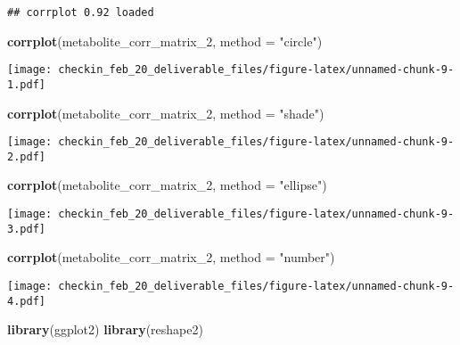 \documentclass[
]{article}
\newenvironment{Shaded}{\begin{snugshade}}{\end{snugshade}}
\newcommand{\AttributeTok}[1]{\textcolor[rgb]{0.13,0.29,0.53}{#1}}
\newcommand{\FunctionTok}[1]{\textcolor[rgb]{0.13,0.29,0.53}{\textbf{#1}}}
\newcommand{\NormalTok}[1]{#1}
\newcommand{\StringTok}[1]{\textcolor[rgb]{0.31,0.60,0.02}{#1}}
\begin{document}
\begin{verbatim}
## corrplot 0.92 loaded
\end{verbatim}

\begin{Shaded}
\begin{Highlighting}[]
\FunctionTok{corrplot}\NormalTok{(metabolite\_corr\_matrix\_2, }\AttributeTok{method =} \StringTok{"circle"}\NormalTok{)}
\end{Highlighting}
\end{Shaded}

\texttt{[image: checkin\_feb\_20\_deliverable\_files/figure-latex/unnamed-chunk-9-1.pdf]}

\begin{Shaded}
\begin{Highlighting}[]
\FunctionTok{corrplot}\NormalTok{(metabolite\_corr\_matrix\_2, }\AttributeTok{method =} \StringTok{"shade"}\NormalTok{)}
\end{Highlighting}
\end{Shaded}

\texttt{[image: checkin\_feb\_20\_deliverable\_files/figure-latex/unnamed-chunk-9-2.pdf]}

\begin{Shaded}
\begin{Highlighting}[]
\FunctionTok{corrplot}\NormalTok{(metabolite\_corr\_matrix\_2, }\AttributeTok{method =} \StringTok{"ellipse"}\NormalTok{)}
\end{Highlighting}
\end{Shaded}

\texttt{[image: checkin\_feb\_20\_deliverable\_files/figure-latex/unnamed-chunk-9-3.pdf]}

\begin{Shaded}
\begin{Highlighting}[]
\FunctionTok{corrplot}\NormalTok{(metabolite\_corr\_matrix\_2, }\AttributeTok{method =} \StringTok{"number"}\NormalTok{)}
\end{Highlighting}
\end{Shaded}

\texttt{[image: checkin\_feb\_20\_deliverable\_files/figure-latex/unnamed-chunk-9-4.pdf]}

\begin{Shaded}
\begin{Highlighting}[]
\FunctionTok{library}\NormalTok{(ggplot2)}
\FunctionTok{library}\NormalTok{(reshape2)}
\end{Highlighting}
\end{Shaded}
\end{document}
